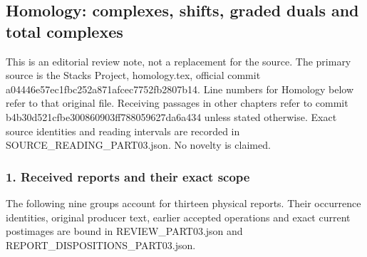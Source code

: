 \subsection{Homology: complexes, shifts, graded duals and total complexes}\label{homology-complexes-shifts-graded-duals-and-total-complexes}

This is an editorial review note, not a replacement for the source. The primary source is the Stacks Project, homology.tex, official commit a04446e57ec1fbc252a871afcec7752fb2807b14. Line numbers for Homology below refer to that original file. Receiving passages in other chapters refer to commit b4b30d521cfbe300860903ff788059627da6a434 unless stated otherwise. Exact source identities and reading intervals are recorded in SOURCE\_READING\_PART03.json. No novelty is claimed.

\subsubsection{1. Received reports and their exact scope}\label{received-reports-and-their-exact-scope}

The following nine groups account for thirteen physical reports. Their occurrence identities, original producer text, earlier accepted operations and exact current postimages are bound in REVIEW\_PART03.json and REPORT\_DISPOSITIONS\_PART03.json.

